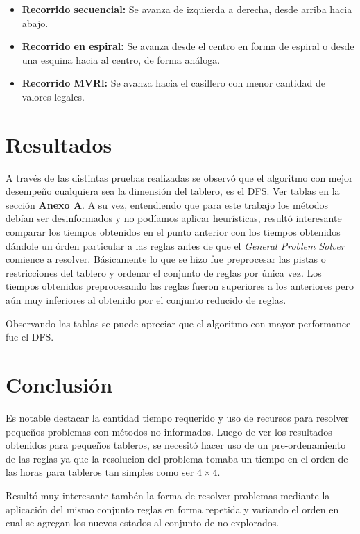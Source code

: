 \documentclass[%
    final,
    reprint,
    notitlepage,
    narroweqnarray,
    inline,
    twoside,
    invited
    ]{ieee}
\begin{document}
\begin{itemize}
\item \textbf{Recorrido secuencial: } Se avanza de izquierda a derecha, desde arriba hacia abajo.
\item \textbf{Recorrido en espiral: } Se avanza desde el centro en forma de espiral o desde una esquina hacia al centro, de forma análoga.
\item \textbf{Recorrido MVRl: } Se avanza hacia el casillero con menor cantidad de valores legales.
\end{itemize}

\section{Resultados}

\par A través de las distintas pruebas realizadas se observó que el algoritmo con mejor desempeño cualquiera sea la dimensión del tablero, es el DFS. Ver tablas en la sección \textbf{Anexo A}. A su vez, entendiendo que para este trabajo los métodos debían ser desinformados y no podíamos aplicar heurísticas,  resultó interesante comparar los tiempos obtenidos en el punto anterior con los tiempos obtenidos dándole un órden particular a las reglas antes de que el \textit{General Problem Solver} comience a resolver. Básicamente lo que se hizo fue preprocesar las pistas o restricciones del tablero y ordenar el conjunto de reglas por única vez. Los tiempos obtenidos preprocesando las reglas fueron superiores a los anteriores pero aún muy inferiores al obtenido por el conjunto reducido de reglas.

\par Observando las tablas se puede apreciar que el algoritmo con mayor performance fue el DFS.

\section{Conclusión}

\PARstart Es notable destacar la cantidad tiempo requerido y uso de recursos para resolver pequeños problemas con métodos no informados. Luego de ver los resultados obtenidos para pequeños tableros, se necesitó hacer uso de un pre-ordenamiento de las reglas ya que la resolucion del problema tomaba un tiempo en el orden de las horas para tableros tan simples como ser $4\times4$.\\

\par Resultó muy interesante tambén la forma de resolver problemas mediante la aplicación del mismo conjunto reglas en forma repetida y variando el orden en cual se agregan los nuevos estados al conjunto de no explorados.
\end{document}
